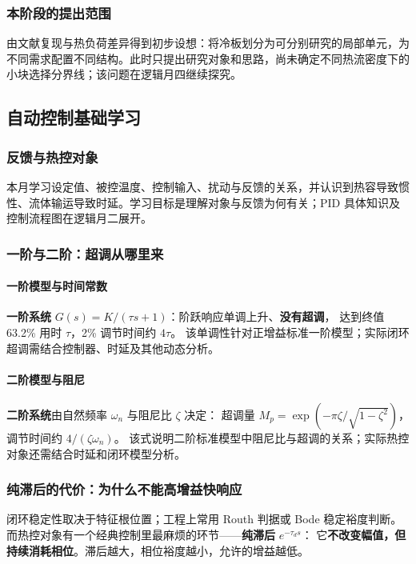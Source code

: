 \documentclass[stage1,fontset=fandol]{ydzjreport}
\begin{document}
\subsubsection{本阶段的提出范围}

由文献复现与热负荷差异得到初步设想：将冷板划分为可分别研究的局部单元，为不同需求配置不同结构。此时只提出研究对象和思路，尚未确定不同热流密度下的小块选择分界线；该问题在逻辑月四继续探究。

\subsection{自动控制基础学习}

\subsubsection{反馈与热控对象}

本月学习设定值、被控温度、控制输入、扰动与反馈的关系，并认识到热容导致惯性、流体输运导致时延。学习目标是理解对象与反馈为何有关；PID 具体知识及控制流程图在逻辑月二展开。

\subsubsection{一阶与二阶：超调从哪里来}

	\paragraph{一阶模型与时间常数}
\textbf{一阶系统} $G(s)=K/(\tau s+1)$：阶跃响应单调上升、\textbf{没有超调}，
	达到终值 63.2\% 用时 $\tau$，2\% 调节时间约 $4\tau$。
	该单调性针对正增益标准一阶模型；实际闭环超调需结合控制器、时延及其他动态分析。

	\paragraph{二阶模型与阻尼}
\textbf{二阶系统}由自然频率 $\omega_n$ 与阻尼比 $\zeta$ 决定：
	超调量 $M_p = \exp\!\left(-\pi\zeta/\sqrt{1-\zeta^2}\right)$，
	调节时间约 $4/(\zeta\omega_n)$。
	该式说明二阶标准模型中阻尼比与超调的关系；实际热控对象还需结合时延和闭环模型分析。

	\subsubsection{纯滞后的代价：为什么不能高增益快响应}

	闭环稳定性取决于特征根位置；工程上常用 Routh 判据或 Bode 稳定裕度判断。
	而热控对象有一个经典控制里最麻烦的环节——\textbf{纯滞后} $e^{-\tau_d s}$：
	它\textbf{不改变幅值，但持续消耗相位}。滞后越大，相位裕度越小，允许的增益越低。
\end{document}
